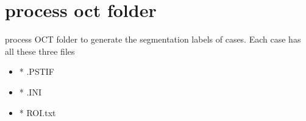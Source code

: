 \documentclass[letterpaper,10pt,english]{sphinxmanual}
\begin{document}
\section{process oct folder}
\label{\detokenize{index:module-util.process_oct_folder}}\label{\detokenize{index:process-oct-folder}}
process OCT folder to generate the segmentation labels of cases. Each case has all these three files
\begin{itemize}
\item {} 
* .PSTIF

\item {} 
* .INI

\item {} 
* ROI.txt

\end{itemize}
\end{document}
